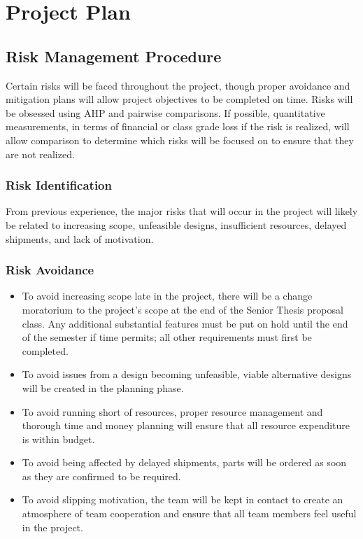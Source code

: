 \chapter{Project Plan}
\section{Risk Management Procedure}
Certain risks will be faced throughout the project, though proper avoidance and mitigation plans will allow project objectives to be completed on time.
Risks will be obsessed using AHP and pairwise comparisons.
If possible, quantitative measurements, in terms of financial or class grade loss if the risk is realized, will allow comparison to determine which risks will be focused on to ensure that they are not realized.

\subsection{Risk Identification}
From previous experience, the major risks that will occur in the project will likely be related to increasing scope, unfeasible designs, insufficient resources, delayed shipments, and lack of motivation.

\subsection{Risk Avoidance}
\begin{itemize} \parskip2pt
	\item To avoid increasing scope late in the project, there will be a change moratorium to the project's scope at the end of the Senior Thesis proposal class.
Any additional substantial features must be put on hold until the end of the semester if time permits; all other requirements must first be completed.
	\item To avoid issues from a design becoming unfeasible, viable alternative designs will be created in the planning phase.
	\item To avoid running short of resources, proper resource management and thorough time and money planning will ensure that all resource expenditure is within budget.
	\item To avoid being affected by delayed shipments, parts will be ordered as soon as they are confirmed to be required.
	\item To avoid slipping motivation, the team will be kept in contact to create an atmosphere of team cooperation and ensure that all team members feel useful in the project.
\end{itemize}	

